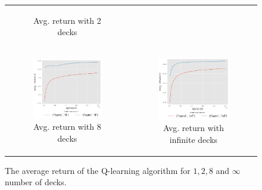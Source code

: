 \begin{figure}[htp]
\begin{tabular}{cc}
\begin{subfigure}[b]{0.48\textwidth}
   \caption{Avg. return with 2 decks\label{sfig:nd2}}
 \end{subfigure}
 \\
 \begin{subfigure}[b]{0.48\textwidth}
  	 \includegraphics[width=\textwidth]{./figures/avgReturnEp_ndeck8.png}
   \caption{Avg. return with 8 decks \label{sfig:nd8}}
 \end{subfigure}
 &
 \begin{subfigure}[b]{0.48\textwidth}
  	 \includegraphics[width=\textwidth]{./figures/avgReturnEp_ndeckinf.png}
   \caption{Avg. return with infinite decks \label{sfig:ndinf}}
 \end{subfigure}
\end{tabular}
\caption{The average return of the Q-learning algorithm for $1,2,8$ and $\infty$ number of decks. \label{fig:avg_return}}
\end{figure}

